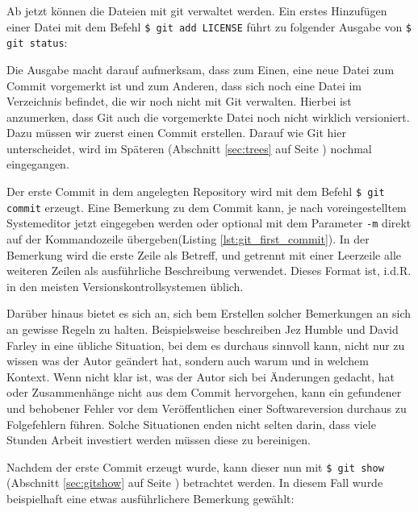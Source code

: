 

Ab jetzt können die Dateien mit \gls{git} verwaltet werden. Ein erstes
Hinzufügen einer Datei mit dem Befehl \texttt{\$ git add LICENSE} führt zu
folgender Ausgabe von \texttt{\$ git status}:



Die Ausgabe macht darauf aufmerksam, dass zum Einen, eine neue Datei zum Commit
vorgemerkt ist und zum Anderen, dass sich noch eine Datei im Verzeichnis
befindet, die wir noch nicht mit Git verwalten. Hierbei ist anzumerken, dass
Git auch die vorgemerkte Datei noch nicht wirklich versioniert. Dazu müssen wir
zuerst einen Commit erstellen. Darauf wie Git hier unterscheidet, wird im
Späteren (Abschnitt \ref{sec:trees} auf Seite \pageref{sec:trees}) nochmal
eingegangen.

Der erste Commit in dem angelegten Repository wird mit dem Befehl \texttt{\$
git commit} erzeugt. Eine Bemerkung zu dem Commit kann, je nach
voreingestelltem Systemeditor jetzt eingegeben werden oder optional mit dem
Parameter \texttt{-m} direkt auf der Kommandozeile übergeben(Listing
\ref{lst:git_first_commit}). In der Bemerkung wird die erste Zeile als Betreff,
und getrennt mit einer Leerzeile alle weiteren Zeilen als ausführliche
Beschreibung verwendet. Dieses Format ist, i.d.R. in den meisten
Versionskontrollsystemen üblich.



Darüber hinaus bietet es sich an, sich bem Erstellen solcher Bemerkungen an sich
an gewisse Regeln zu halten. Beispielsweise beschreiben Jez Humble und David
Farley in \cite[S.~37]{cd} eine übliche Situation, bei dem es durchaus sinnvoll
kann, nicht nur zu wissen was der Autor geändert hat, sondern auch warum
und in welchem Kontext. Wenn nicht klar ist, was der Autor sich bei
Änderungen gedacht, hat oder Zusammenhänge nicht aus dem Commit hervorgehen, kann
ein gefundener und behobener Fehler vor dem Veröffentlichen einer
Softwareversion durchaus zu Folgefehlern führen. Solche Situationen enden
nicht selten darin, dass viele Stunden Arbeit investiert werden müssen diese zu
bereinigen.\cite[S.~37]{cd}

Nachdem der erste Commit erzeugt wurde, kann dieser nun mit \texttt{\$ git
show} (Abschnitt \ref{sec:gitshow} auf Seite \pageref{sec:git_show}) betrachtet
werden. In diesem Fall wurde beispielhaft eine etwas ausführlichere Bemerkung
gewählt:

